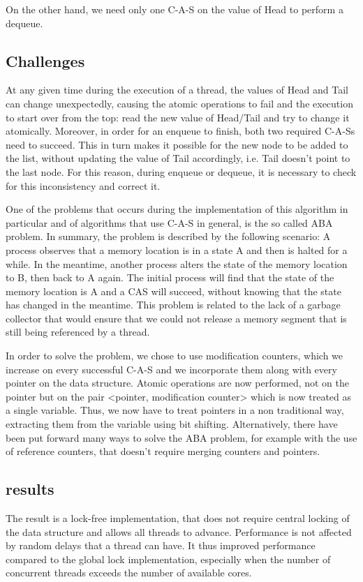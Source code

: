 On the other hand, we need only one C-A-S on the value of Head to perform a dequeue.

\subsection{Challenges}
At any given time during the execution of a thread, the values of Head and Tail can change unexpectedly, causing the atomic operations to fail and the execution to start over from the top: read the new value of Head/Tail and try to change it atomically. Moreover, in order for an enqueue to finish, both two required C-A-Ss need to succeed. This in turn makes it possible for the new node to be added to the list, without updating the value of Tail accordingly, i.e. Tail doesn't point to the last node. For  this reason, during enqueue or dequeue, it is necessary to check for this inconsistency and correct it.

One of the problems that occurs during the implementation of this algorithm in particular and of algorithms that use C-A-S in general, is the so called ABA problem. In summary, the problem is described by the following scenario: A process observes that a memory location is in a state A and then is halted for a while. In the meantime, another process alters the state of the memory location to B, then back to A again. The initial process will find that the state of the memory location is A and a CAS will succeed, without knowing that the state has changed in the meantime. This problem is related to the lack of a garbage collector that would ensure that we could not release a memory segment that is still being referenced by a thread.

In order to solve the problem, we chose to use modification counters, which we increase on every successful C-A-S and we incorporate them along with every pointer on the data structure. Atomic operations are now performed, not on the pointer but on the pair <pointer, modification counter> which is now treated as a single variable. Thus, we now have to treat pointers in a non traditional way, extracting them from the variable using bit shifting. Alternatively,  there have been put forward many ways to solve the ABA problem, for example with the use of reference counters, that doesn't require merging counters and pointers.

\subsection{results}
The result is a lock-free implementation,  that does not require central locking of the data structure and allows all threads to advance. Performance is not affected by random delays that a thread can have. It thus improved performance compared to the global lock implementation, especially when the number of concurrent threads exceeds the number of available cores.

